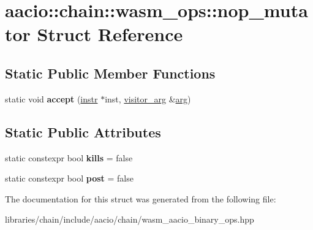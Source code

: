 \hypertarget{structaacio_1_1chain_1_1wasm__ops_1_1nop__mutator}{}\section{aacio\+:\+:chain\+:\+:wasm\+\_\+ops\+:\+:nop\+\_\+mutator Struct Reference}
\label{structaacio_1_1chain_1_1wasm__ops_1_1nop__mutator}
\subsection*{Static Public Member Functions}
\begin{DoxyCompactItemize}
\item 
\mbox{\label{structaacio_1_1chain_1_1wasm__ops_1_1nop__mutator_a2ea39473419a7ec647bf7a7149d4442c}} 
static void {\bfseries accept} (\mbox{\hyperlink{structaacio_1_1chain_1_1wasm__ops_1_1instr}{instr}} $\ast$inst, \mbox{\hyperlink{structaacio_1_1chain_1_1wasm__ops_1_1visitor__arg}{visitor\+\_\+arg}} \&\mbox{\hyperlink{unionarg}{arg}})
\end{DoxyCompactItemize}
\subsection*{Static Public Attributes}
\begin{DoxyCompactItemize}
\item 
\mbox{\label{structaacio_1_1chain_1_1wasm__ops_1_1nop__mutator_a4a80d03776c31bb53312fc9252e801b8}} 
static constexpr bool {\bfseries kills} = false
\item 
\mbox{\label{structaacio_1_1chain_1_1wasm__ops_1_1nop__mutator_a071b27e34ca092c2982a62c5d89aec62}} 
static constexpr bool {\bfseries post} = false
\end{DoxyCompactItemize}


The documentation for this struct was generated from the following file\+:\begin{DoxyCompactItemize}
\item 
libraries/chain/include/aacio/chain/wasm\+\_\+aacio\+\_\+binary\+\_\+ops.\+hpp\end{DoxyCompactItemize}
